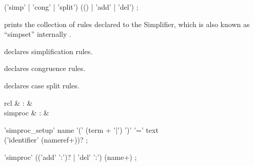 \begin{isabellebody}
\begin{isamarkuptext}
  \begin{rail}
    ('simp' | 'cong' | 'split') (() | 'add' | 'del')
    ;
  \end{rail}

  \begin{descr}

  \item [\hyperlink{command.print-simpset}{\mbox{\isa{\isacommand{print{\isacharunderscore}simpset}}}}] prints the collection of rules
  declared to the Simplifier, which is also known as ``simpset''
  internally \cite{isabelle-ref}.

  \item [\hyperlink{attribute.simp}{\mbox{\isa{simp}}}] declares simplification rules.

  \item [\hyperlink{attribute.cong}{\mbox{\isa{cong}}}] declares congruence rules.

  \item [\hyperlink{attribute.split}{\mbox{\isa{split}}}] declares case split rules.

  \end{descr}%
\end{isamarkuptext}%
\isamarkuptrue%
%
\isamarkuptrue%
%
\begin{isamarkuptext}%
\begin{matharray}{rcl}
    \hypertarget{command.simproc-setup}{\hyperlink{command.simproc-setup}{\mbox{}}} & : &  \\
    simproc & : & \isaratt \\
  \end{matharray}

  \begin{rail}
    'simproc\_setup' name '(' (term + '|') ')' '=' text \\ ('identifier' (nameref+))?
    ;

    'simproc' (('add' ':')? | 'del' ':') (name+)
    ;
  \end{rail}

  \begin{descr}


\end{descr}
\end{isamarkuptext}
\end{isabellebody}

